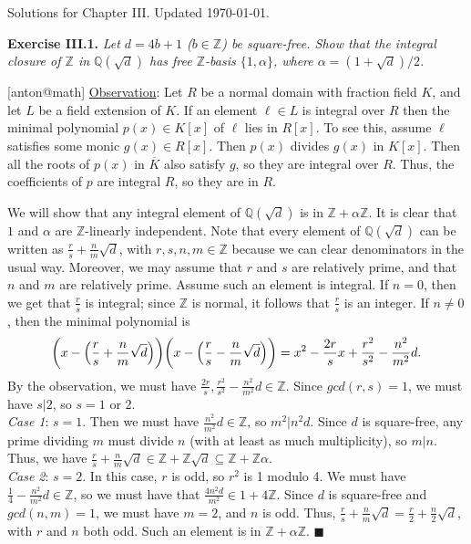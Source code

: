 \documentclass{article}
\makeatletter
\newcommand\<{\triangleleft}
\newcommand{\QQ}{\ensuremath{\mathbb{Q}}}
\newcommand{\ZZ}{\ensuremath{\mathbb{Z}}}
\newenvironment{exercise}[1]{\gdef\currentEx{#1}\begin{trivlist}\item[]%
                \textbf{Exercise #1.} \it}{\end{trivlist}}
\newenvironment{solution}[1]{\def\x{#1}\begin{trivlist}\item[]\hspace*{-.5em}[\x]}
                {\hspace*{\fill} $\blacksquare$
                \protected@write0{}{\currentEx, \x}
                \end{trivlist}}
\makeatother
\begin{document}

 {\large \noindent Solutions for Chapter III. Updated \today.}

 \begin{exercise}{III.1}
   Let $d=4b+1$ ($b\in \ZZ$) be square-free. Show that the integral closure of $\ZZ$ in
   $\QQ(\sqrt d)$ has free $\ZZ$-basis $\{1,\alpha\}$, where $\alpha=(1+\sqrt d)/2$.
 \end{exercise}
 \begin{solution}{anton@math}
   \underline{Observation}: Let $R$ be a normal domain with fraction field $K$, and let
   $L$ be a field extension of $K$. If an element $\ell\in L$ is integral over $R$ then
   the minimal polynomial $p(x)\in K[x]$ of $\ell$ lies in $R[x]$. To see this, assume
   $\ell$ satisfies some monic $g(x)\in R[x]$. Then $p(x)$ divides $g(x)$ in $K[x]$. Then
   all the roots of $p(x)$ in $\overline K$ also satisfy $g$, so they are integral over
   $R$. Thus, the coefficients of $p$ are integral $R$, so they are in $R$.

   We will show that any integral element of $\QQ(\sqrt d)$ is in $\ZZ+\alpha \ZZ$. It is
   clear that $1$ and $\alpha$ are $\ZZ$-linearly independent. Note that every element of
   $\QQ(\sqrt d)$ can be written as $\frac rs +\frac nm \sqrt d$, with $r,s,n,m\in \ZZ$
   because we can clear denominators in the usual way. Moreover, we may assume that $r$
   and $s$ are relatively prime, and that $n$ and $m$ are relatively prime. Assume such
   an element is integral. If $n=0$, then we get that $\frac rs$ is integral; since $\ZZ$
   is normal, it follows that $\frac rs$ is an integer. If $n\neq 0$, then the minimal
   polynomial is
   \[
    \biggl( x-\Bigl(\frac rs+\frac nm \sqrt d\Bigr)\biggr)\biggl( x-\Bigl(\frac rs-\frac nm
    \sqrt d\Bigr)\biggr) = x^2- \frac {2r}s x + \frac{r^2}{s^2}- \frac{n^2}{m^2}d.
   \]
   By the observation, we must have $\frac{2r}{s},\frac{r^2}{s^2}- \frac{n^2}{m^2}d\in
   \ZZ$. Since $gcd(r,s)=1$, we must have $s|2$, so $s=1$ or 2.\\
   \textit{Case 1}: $s=1$. Then we must have $\frac{n^2}{m^2}d\in \ZZ$, so $m^2|n^2d$.
   Since $d$ is square-free, any prime dividing $m$ must divide $n$ (with at least as
   much multiplicity), so $m|n$. Thus, we have $\frac rs + \frac nm \sqrt d\in
   \ZZ+\ZZ\sqrt d \subseteq \ZZ + \ZZ\alpha$.\\
   \textit{Case 2}: $s=2$. In this case, $r$ is odd, so $r^2$ is 1 modulo 4. We must have
   $\frac 14 - \frac{n^2}{m^2}d\in \ZZ$, so we must have that $\frac{4n^2 d}{m^2}\in
   1+4\ZZ$. Since $d$ is square-free and $gcd(n,m)=1$, we must have $m=2$, and $n$ is
   odd. Thus, $\frac rs +\frac nm \sqrt d = \frac r2 + \frac n2 \sqrt d$, with $r$ and
   $n$ both odd. Such an element is in $\ZZ+\alpha\ZZ$.
 \end{solution}
\end{document}
